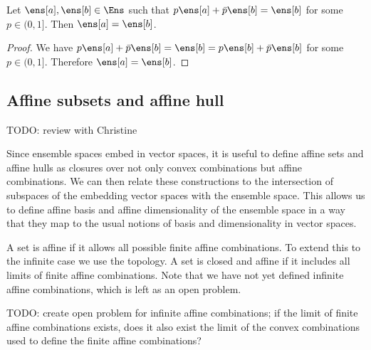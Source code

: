 \begin{mathSection}
	\begin{coro}
		Let $\ens[a], \ens[b] \in \Ens$ such that $p\ens[a] + \bar{p} \ens[b] = \ens[b]$ for some $p \in (0,1]$. Then $\ens[a] = \ens[b]$. 
	\end{coro}
	
	\begin{proof}
		We have $p\ens[a] + \bar{p} \ens[b] = \ens[b] = p\ens[b] + \bar{p} \ens[b]$ for some $p \in (0,1]$. Therefore $\ens[a] = \ens[b]$.
	\end{proof}
\end{mathSection}

\subsection{Affine subsets and affine hull}

TODO: review with Christine

Since ensemble spaces embed in vector spaces, it is useful to define affine sets and affine hulls as closures over not only convex combinations but affine combinations. We can then relate these constructions to the intersection of subspaces of the embedding vector spaces with the ensemble space. This allows us to define affine basis and affine dimensionality of the ensemble space in a way that they map to the usual notions of basis and dimensionality in vector spaces.

A set is affine if it allows all possible finite affine combinations. To extend this to the infinite case we use the topology. A set is closed and affine if it includes all limits of finite affine combinations. Note that we have not yet defined infinite affine combinations, which is left as an open problem.

TODO: create open problem for infinite affine combinations; if the limit of finite affine combinations exists, does it also exist the limit of the convex combinations used to define the finite affine combinations?

